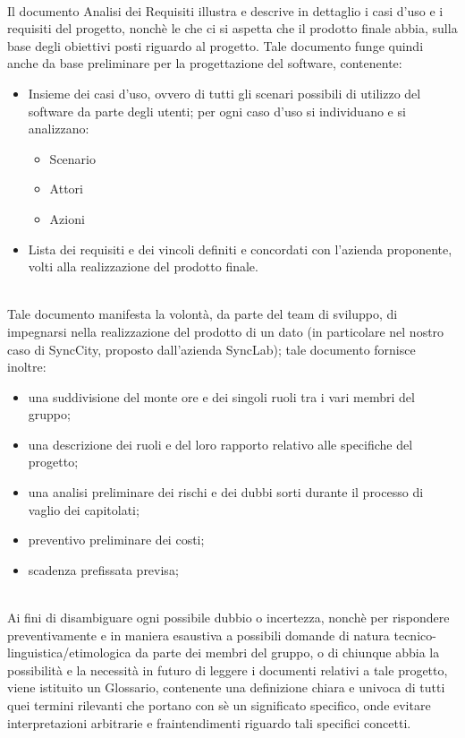 \\
Il documento Analisi dei Requisiti illustra e descrive in dettaglio i casi d'uso e i requisiti del progetto, nonchè le  che ci si aspetta che il prodotto finale abbia, sulla base degli obiettivi posti riguardo al progetto. Tale documento funge quindi anche da base preliminare per la progettazione del software, contenente:
\begin{itemize}
    \item Insieme dei casi d'uso, ovvero di tutti gli scenari possibili di utilizzo del software da parte degli utenti; per ogni caso d'uso si individuano e si analizzano: 
    \begin{itemize}
        \item Scenario
        \item Attori
        \item Azioni
    \end{itemize} 
    \item Lista dei requisiti e dei vincoli definiti e concordati con l'azienda proponente, volti alla realizzazione del prodotto finale.
\end{itemize}

\\
Tale documento manifesta la volontà, da parte del team di sviluppo, di impegnarsi nella realizzazione del prodotto di un dato  (in particolare nel nostro caso di SyncCity, proposto dall'azienda SyncLab); tale documento fornisce inoltre:
\begin{itemize}
    \item una suddivisione del monte ore e dei singoli ruoli tra i vari membri del gruppo;
    \item una descrizione dei ruoli e del loro rapporto relativo alle specifiche del progetto;
    \item una analisi preliminare dei rischi e dei dubbi sorti durante il processo di vaglio dei capitolati;
    \item preventivo preliminare dei costi;
    \item scadenza prefissata previsa;
\end{itemize}

\\
Ai fini di disambiguare ogni possibile dubbio o incertezza, nonchè per rispondere preventivamente e in maniera esaustiva a possibili domande di natura tecnico-linguistica/etimologica da parte dei membri del gruppo, o di chiunque abbia la possibilità e la necessità in futuro di leggere i documenti relativi a tale progetto, viene istituito un Glossario, contenente una definizione chiara e univoca di tutti quei termini rilevanti che portano con sè un significato specifico, onde evitare interpretazioni arbitrarie e fraintendimenti riguardo tali specifici concetti.


